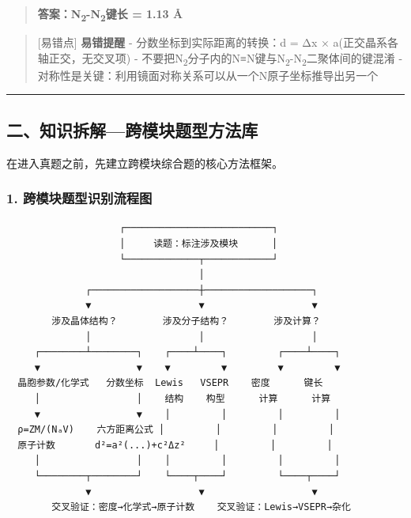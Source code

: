 \documentclass[a4paper,11pt]{ctexart}
\newcommand{\箭}{\ensuremath{\rightarrow}}
\newcommand{\左箭}{\ensuremath{\leftarrow}}
\newcommand{\上箭}{\ensuremath{\uparrow}}
\newcommand{\下箭}{\ensuremath{\downarrow}}
\newcommand{\衡}{\ensuremath{\rightleftharpoons}}
\newcommand{\双箭}{\ensuremath{\leftrightarrow}}
\newcommand{\约等于}{\ensuremath{\approx}}
\newcommand{\小于等于}{\ensuremath{\leq}}
\newcommand{\大于等于}{\ensuremath{\geq}}
\newcommand{\不等于}{\ensuremath{\neq}}
\newcommand{\西格马}{\ensuremath{\sigma}}
\newcommand{\派}{\ensuremath{\pi}}
\begin{document}
\begin{quote}
\textbf{答案：N\textsubscript{2}-N\textsubscript{2}键长 = 1.13 Å}
\end{quote}

\begin{quote}
{[}易错点{]} \textbf{易错提醒}
- 分数坐标到实际距离的转换：d = Δx × a(正交晶系各轴正交，无交叉项)
- 不要把N\textsubscript{2}分子内的N≡N键与N\textsubscript{2}-N\textsubscript{2}二聚体间的键混淆
- 对称性是关键：利用镜面对称关系可以从一个N原子坐标推导出另一个
\end{quote}

\begin{center}\rule{0.5\linewidth}{0.5pt}\end{center}

\subsection{二、知识拆解---跨模块题型方法库}\label{ux4e8cux77e5ux8bc6ux62c6ux89e3ux8de8ux6a21ux5757ux9898ux578bux65b9ux6cd5ux5e93}

在进入真题之前，先建立跨模块综合题的核心方法框架。

\subsubsection{1. 跨模块题型识别流程图}\label{ux8de8ux6a21ux5757ux9898ux578bux8bc6ux522bux6d41ux7a0bux56fe}

\begin{verbatim}
                    ┌──────────────────────────┐
                    │     读题：标注涉及模块      │
                    └─────────────┬────────────┘
                                  │
              ┌───────────────────┼───────────────────┐
              ▼                   ▼                   ▼
        涉及晶体结构？        涉及分子结构？        涉及计算？
              │                   │                   │
     ┌────────┴────────┐    ┌────┴────┐         ┌────┴────┐
     ▼                 ▼    ▼         ▼         ▼         ▼
  晶胞参数/化学式   分数坐标  Lewis   VSEPR    密度      键长
     │                 │    结构    构型      计算      计算
     ▼                 ▼    │         │         │         │
  ρ=ZM/(NₐV)    六方距离公式 │         │         │         │
  原子计数       d²=a²(...)+c²Δz²     │         │         │
     │                 │    │         │         │         │
     └────────┬────────┘    └────┬────┘         └────┬────┘
              ▼                   ▼                   ▼
        交叉验证：密度→化学式→原子计数    交叉验证：Lewis→VSEPR→杂化
\end{verbatim}
\end{document}
